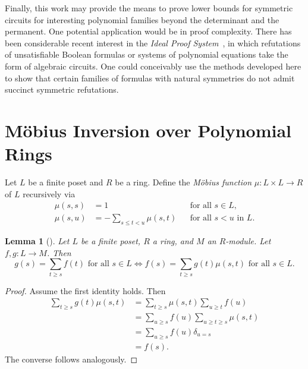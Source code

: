 \documentclass[10pt,a4paper]{article}
\theoremstyle{definition}
\theoremstyle{plain}
\newtheorem{lemma}[definition]{Lemma}
\theoremstyle{remark}
\begin{document}
Finally, this work may provide the means to prove lower bounds for
symmetric circuits for interesting polynomial families beyond the
determinant and the permanent.  One potential application would be in
proof complexity.  There has been considerable recent interest in the
\emph{Ideal Proof System}~\cite{grochow_pitassi}, in which refutations of unsatisfiable Boolean formulas or systems of polynomial equations take the
form of algebraic circuits.  One could conceivably use the methods
developed here to show that certain families of formulas with natural
symmetries do not admit succinct symmetric refutations.

	
	
	
	
	
	
	
	\newpage
	\printbibliography
	\newpage
	
	\appendix 
	
	\section{Möbius Inversion over Polynomial Rings}
	
	Let $L$ be a finite poset and $R$ be a ring.
	Define the \emph{Möbius function} $\mu \colon L \times L \to R$ of $L$ recursively via
	\begin{align*}
		\mu(s,s) &= 1 && \text{for all } s \in L, \\
		\mu(s,u) &= - \sum_{s \leq t < u} \mu(s, t) && \text{for all } s < u \text{ in } L.
	\end{align*}
	
	\begin{lemma}[{\cite[Proposition~3.7.2]{stanley_enumerative_1997}}]\label{lem:moebius}
		Let $L$ be a finite poset, $R$ a ring, and $M$ an $R$-module.
		Let $f, g \colon L \to M$. Then
		\[
		g(s) = \sum_{t \geq s} f(t) \text{ for all } s\in L
		\iff
		f(s) = \sum_{t \geq s} g(t) \mu(s,t) \text{ for all } s \in L.
		\]
	\end{lemma}
	\begin{proof}
		Assume the first identity holds. Then
		\begin{align*}
			\sum_{t \geq s} g(t) \mu(s,t) &= \sum_{t \geq s} \mu(s,t) \sum_{u \geq t} f(u) \\
			&= \sum_{u \geq s} f(u) \sum_{u \geq t \geq s} \mu(s, t) \\ 
			&= \sum_{u \geq s} f(u) \delta_{u = s} \\
			&= f(s).
		\end{align*}
		The converse follows analogously.
	\end{proof}
\end{document}
